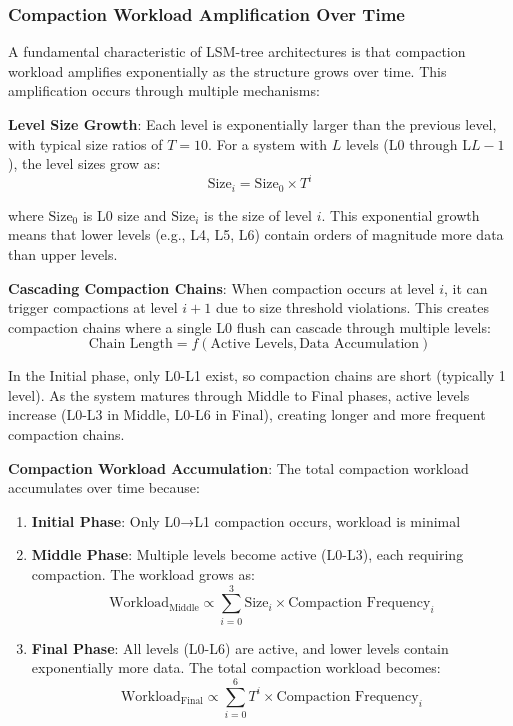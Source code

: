 \documentclass[11pt]{article}
\begin{document}
\subsubsection{Compaction Workload Amplification Over Time}
A fundamental characteristic of LSM-tree architectures is that compaction workload amplifies exponentially as the structure grows over time. This amplification occurs through multiple mechanisms:

\textbf{Level Size Growth}: Each level is exponentially larger than the previous level, with typical size ratios of $T = 10$. For a system with $L$ levels (L0 through L$L-1$), the level sizes grow as:
\begin{equation}
\text{Size}_i = \text{Size}_0 \times T^i
\end{equation}

where $\text{Size}_0$ is L0 size and $\text{Size}_i$ is the size of level $i$. This exponential growth means that lower levels (e.g., L4, L5, L6) contain orders of magnitude more data than upper levels.

\textbf{Cascading Compaction Chains}: When compaction occurs at level $i$, it can trigger compactions at level $i+1$ due to size threshold violations. This creates compaction chains where a single L0 flush can cascade through multiple levels:
\begin{equation}
\text{Chain Length} = f(\text{Active Levels}, \text{Data Accumulation})
\end{equation}

In the Initial phase, only L0-L1 exist, so compaction chains are short (typically 1 level). As the system matures through Middle to Final phases, active levels increase (L0-L3 in Middle, L0-L6 in Final), creating longer and more frequent compaction chains.

\textbf{Compaction Workload Accumulation}: The total compaction workload accumulates over time because:
\begin{enumerate}
    \item \textbf{Initial Phase}: Only L0→L1 compaction occurs, workload is minimal
    \item \textbf{Middle Phase}: Multiple levels become active (L0-L3), each requiring compaction. The workload grows as:
    \[
    \text{Workload}_{\text{Middle}} \propto \sum_{i=0}^{3} \text{Size}_i \times \text{Compaction Frequency}_i
    \]
    \item \textbf{Final Phase}: All levels (L0-L6) are active, and lower levels contain exponentially more data. The total compaction workload becomes:
    \[
    \text{Workload}_{\text{Final}} \propto \sum_{i=0}^{6} T^i \times \text{Compaction Frequency}_i
    \]
\end{enumerate}
\end{document}
